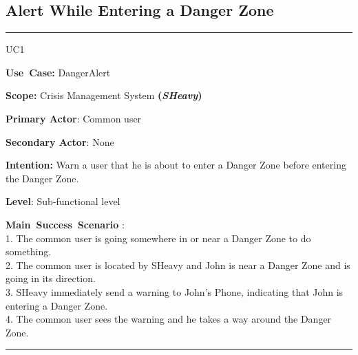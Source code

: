 \subsection{Alert While Entering a Danger Zone}
\vspace{0.5cm}
\hrule
\vspace{0.5cm}
\begin{lyxlist}{UC1}
\small{
\item [\textbf{Use~Case:}] DangerAlert
\item [\textbf{Scope:}] Crisis Management System \textbf{(\emph{SHeavy})}
\item [\textbf{Primary Actor}:] Common user
\item [\textbf{Secondary Actor}:] None
\item [\textbf{Intention:}]Warn a user that he is about to enter a Danger Zone 
before entering the Danger Zone.
\item [\textbf{Level}:]Sub-functional level
\item [\textbf{Main~Success~Scenario}]:\\
1. The common user is going somewhere in or near a Danger Zone to do
something.\\
2. The common user is located by SHeavy and John is near a Danger Zone and is
going in its direction.\\
3. SHeavy immediately send a warning to John's Phone, indicating 
that John is entering a Danger Zone.\\
4. The common user sees the warning and he takes a way around the Danger Zone.\\
}
\end{lyxlist}
\hrule
\vspace{0.5cm} 



















